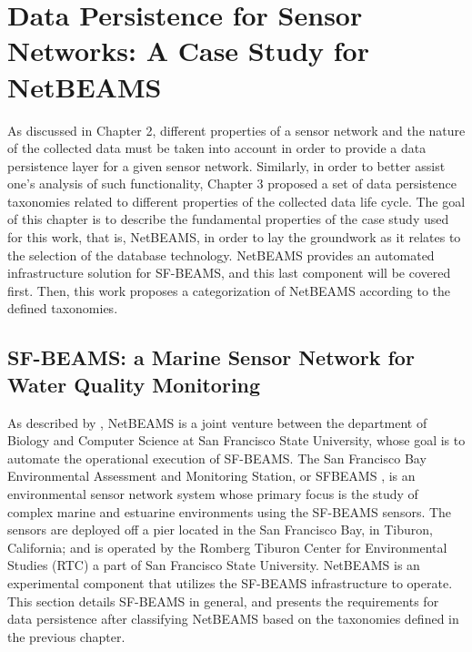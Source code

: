 

\chapter{Data Persistence for Sensor Networks: A Case Study for NetBEAMS}
\label{chap:netbeams-overview}

As discussed in Chapter 2, different properties of a sensor network and the
nature of the collected data must be taken into account in order to provide a
data persistence layer for a given sensor network. Similarly, in order to
better assist one's analysis of such functionality, Chapter 3 proposed a set of
data persistence taxonomies related to different properties of the collected
data life cycle. The goal of this chapter is to describe the fundamental properties 
of the case study used for this work, that is, NetBEAMS, in order to lay the 
groundwork as it relates to the selection of the database technology. NetBEAMS 
provides an automated infrastructure solution for SF-BEAMS, and this last component 
will be covered first. Then, this work proposes a categorization of NetBEAMS
according to the defined taxonomies.

\section{SF-BEAMS: a Marine Sensor Network for Water Quality Monitoring}

As described by \cite{netbeams2009}, NetBEAMS is a joint venture between the
department of Biology and Computer Science at San Francisco State University,
whose goal is to automate the operational execution of SF-BEAMS. The San Francisco
Bay Environmental Assessment and Monitoring Station, or SFBEAMS \cite{sfbeams2006}, 
is an environmental sensor network system whose primary focus is the study of complex 
marine and estuarine environments using the SF-BEAMS sensors. The sensors are deployed off a
pier located in the San Francisco Bay, in Tiburon, California; and is operated by 
the Romberg Tiburon Center for Environmental Studies (RTC) a part of San Francisco
State University. NetBEAMS is an experimental component that utilizes the SF-BEAMS 
infrastructure to operate. This section details SF-BEAMS in general, and
presents the requirements for data persistence after classifying NetBEAMS based
on the taxonomies defined in the previous chapter.

